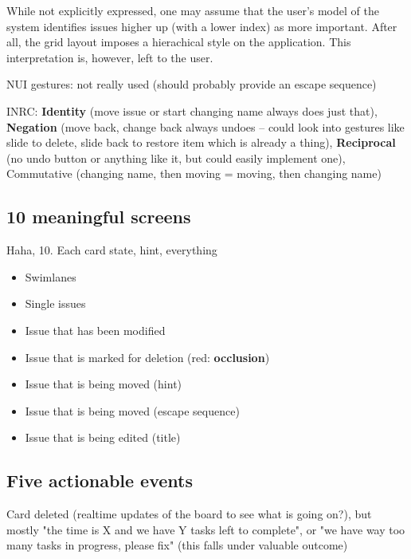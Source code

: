 While not explicitly expressed, one may assume that the user's model of the system identifies issues higher up (with a lower index) as more important. After all, the grid layout imposes a hierachical style on the application. This interpretation is, however, left to the user.

NUI gestures: not really used (should probably provide an escape sequence)

INRC: \textbf{Identity} (move issue or start changing name always does just that), \textbf{Negation} (move back, change back always undoes – could look into gestures like slide to delete, slide back to restore item which is already a thing), \textbf{Reciprocal} (no undo button or anything like it, but could easily implement one), Commutative (changing name, then moving = moving, then changing name) %

\subsection{10 meaningful screens}

Haha, 10. Each card state, hint, everything


\begin{itemize}
  \item Swimlanes
  \item Single issues
  \item Issue that has been modified
  \item Issue that is marked for deletion (red: \textbf{occlusion}) 
  \item Issue that is being moved (hint)
  \item Issue that is being moved (escape sequence)
  \item Issue that is being edited (title)
\end{itemize}

\subsection{Five actionable events}

Card deleted (realtime updates of the board to see what is going on?), but mostly "the time is X and we have Y tasks left to complete", or "we have way too many tasks in progress, please fix" (this falls under valuable outcome)

